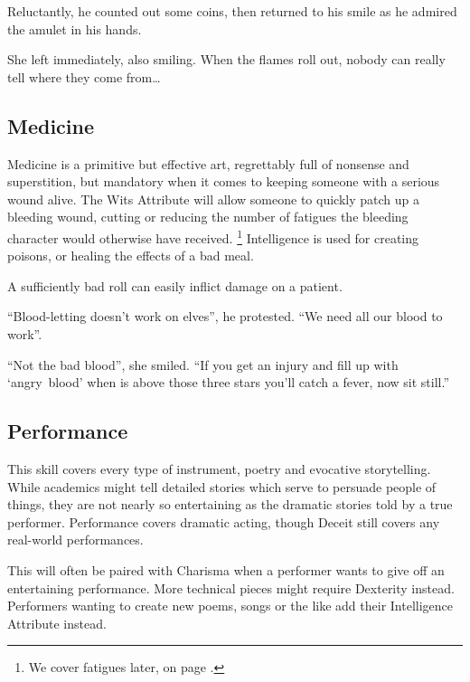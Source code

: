 \begin{multicols}{2}
\begin{exampletext}
  Reluctantly, he counted out some coins, then returned to his smile as he admired the amulet in his hands.

  She left immediately, also smiling.
  When the flames roll out, nobody can really tell where they come from\ldots
\end{exampletext}

\subsection{Medicine}

Medicine is a primitive but effective art, regrettably full of nonsense and superstition, but mandatory when it comes to keeping someone with a serious wound alive.
The Wits Attribute will allow someone to quickly patch up a bleeding wound, cutting or reducing the number of \glspl{fatigue} the bleeding character would otherwise have received.%
\footnote{We cover \glspl{fatigue} later, on page \pageref{fatigue}.}
Intelligence is used for creating poisons, or healing the effects of a bad meal.

A sufficiently bad roll can easily inflict damage on a patient.

\begin{exampletext}
  ``Blood-letting doesn't work on elves'', he protested.
  ``We need all our blood to work''.

  ``Not the bad blood'', she smiled.
  ``If you get an injury and fill up with `angry~blood' when \iftoggle{aif}{\gls{ainumar}}{the moon} is above those three stars you'll catch a fever, now sit still.''
\end{exampletext}

\subsection{Performance}

This skill covers every type of instrument, poetry and evocative storytelling. While academics might tell detailed stories which serve to persuade people of things, they are not nearly so entertaining as the dramatic stories told by a true performer. Performance covers dramatic acting, though Deceit still covers any real-world performances.

This will often be paired with Charisma when a performer wants to give off an entertaining performance. More technical pieces might require Dexterity instead. Performers wanting to create new poems, songs or the like add their Intelligence Attribute instead.


\end{multicols}
